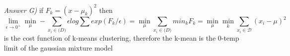 \begin{Q}
\begin{itemize}
\item[\textit{Answer G)}] if $F_k = (x-\mu_k)^2$ then $$\lim_{\epsilon \rightarrow 0^+} \min_{\mu} -\sum_{x_i \in \mathcal(D)} \epsilon log \sum exp(F_k/\epsilon) = \min_{\mu} \sum_{x_i \in \mathcal(D)}  min_{k} F_k = \min_{\mu} \min_k \sum_{x_i \in \mathcal{D}} (x_i - \mu)^2$$ is the cost function of k-means clustering, therefore the k-mean is the 0-temp limit of the gaussian mixture model
 
\end{itemize}


\end{Q}
          
